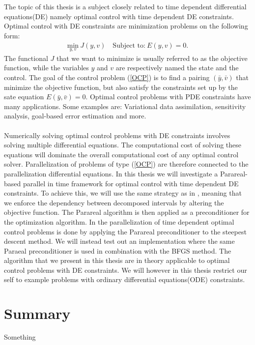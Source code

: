 \\
\\
The topic of this thesis is a subject closely related to time dependent differential equations(DE) namely optimal control with time dependent DE constraints. Optimal control with DE constraints are minimization problems on the following form:
\begin{align}
\underset{y,v}{\text{min}} \ J(y,v) \quad \textrm{Subject to:} \ E(y,v)=0. \label{OCP}
\end{align}
The functional $J$ that we want to minimize is usually referred to as the objective function, while the variables $y$ and $v$ are respectively named the state and the control. The goal of the control problem (\ref{OCP}) is to find a pairing $(\bar y,\bar v)$ that minimize the objective function, but also satisfy the constraints set up by the sate equation $ E(\bar y,\bar v)=0$. Optimal control problems with PDE constraints have many applications. Some examples are: Variational data assimilation, sensitivity analysis, goal-based error estimation and more.
\\
\\
Numerically solving optimal control problems with DE constraints involves solving multiple differential equations. The computational cost of solving these equations will dominate the overall computational cost of any optimal control solver. Parallelization of problems of type (\ref{OCP}) are therefore connected to the parallelization differential equations. In this thesis we will investigate a Parareal-based parallel in time framework for optimal control with time dependent DE constraints. To achieve this, we will use the same strategy as in \cite{maday2002parareal}, meaning that we enforce the dependency between decomposed intervals by altering the objective function. The Parareal algorithm is then applied as a preconditioner for the optimization algorithm. In \cite{maday2002parareal} the parallelization of time dependent optimal control problems is done by applying the Parareal preconditioner to the steepest descent method. We will instead test out an implementation where the same Paraeal preconditioner is used in combination with the BFGS method. The algorithm that we present in this thesis are in theory applicable to optimal control problems with DE constraints. We will however in this thesis restrict our self to example problems with ordinary differential equations(ODE) constraints.
\section{Summary}
Something  